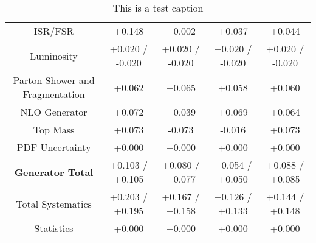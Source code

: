 \begin{table}[htbp]
\begin{center}
\begin{tabular}{|c|c|c|c|c|}
ISR/FSR                               &+0.148              & +0.002              & +0.037              & +0.044             \\
Luminosity                            &+0.020   / -0.020   & +0.020   / -0.020   & +0.020   / -0.020   & +0.020   / -0.020  \\
Parton Shower and Fragmentation       &+0.062              & +0.065              & +0.058              & +0.060             \\
NLO Generator                         &+0.072              & +0.039              & +0.069              & +0.064             \\
Top Mass                              &+0.073              & -0.073              & -0.016              & +0.073             \\
PDF Uncertainty                       &+0.000              & +0.000              & +0.000              & +0.000             \\
\hline
\textbf{Generator Total}              &+0.103   / +0.105   & +0.080   / +0.077   & +0.054   / +0.050   & +0.088   / +0.085  \\
\hline
\hline
Total Systematics                     &+0.203   / +0.195   & +0.167   / +0.158   & +0.126   / +0.133   & +0.144   / +0.148  \\
Statistics                            &+0.000              & +0.000              & +0.000              & +0.000             \\
\hline
  \end{tabular}
  \end{center} 
  \label{tab:xsec_nominal_rratio_high}
  \caption{This is a test caption}
\end{table}
 
